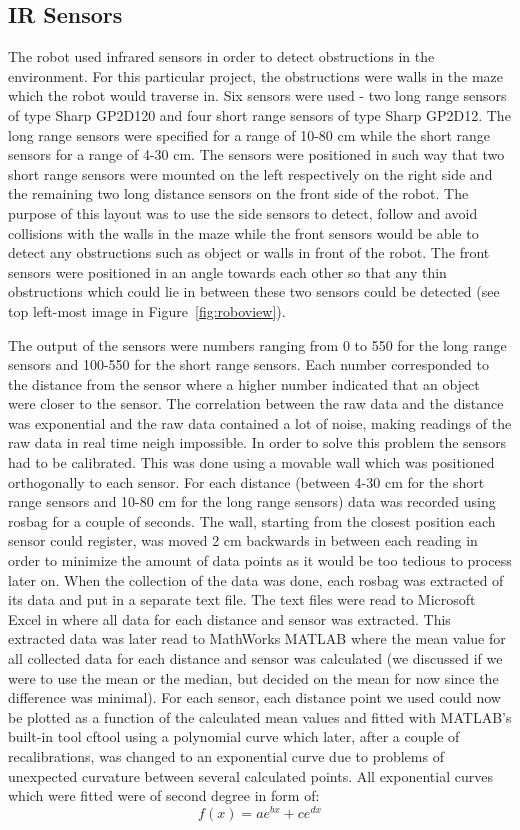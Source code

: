 \documentclass[10pt,a4paper,twocolumn]{article}
\begin{document}
\subsection{IR Sensors}
The robot used infrared sensors in order to detect obstructions in the
environment. For this particular project, the obstructions were walls in the
maze which the robot would traverse in. Six sensors were used - two long range
sensors of type Sharp GP2D120 and four short range sensors of type Sharp GP2D12.
The long range sensors were specified for a range of 10-80 cm while the short
range sensors for a range of 4-30 cm. The sensors were positioned in such way
that two short range sensors were mounted on the left respectively on the right
side and the remaining two long distance sensors on the front side of the robot.
The purpose of this layout was to use the side sensors to detect, follow and
avoid collisions with the walls in the maze while the front sensors would be
able to detect any obstructions such as object or walls in front of the robot.
The front sensors were positioned in an angle towards each other so that any
thin obstructions which could lie in between these two sensors could be detected
(see top left-most image in Figure~\ref{fig:roboview}).

The output of the sensors were numbers ranging from 0 to 550 for the long range
sensors and 100-550 for the short range sensors. Each number corresponded to the
distance from the sensor where a higher number indicated that an object were
closer to the sensor. The correlation between the raw data and the distance was
exponential and the raw data contained a lot of noise, making readings of the
raw data in real time neigh impossible.  In order to solve this problem the
sensors had to be calibrated. This was done using a movable wall which was
positioned orthogonally to each sensor. For each distance (between 4-30 cm for
the short range sensors and 10-80 cm for the long range sensors) data was
recorded using rosbag for a couple of seconds. The wall, starting from the
closest position each sensor could register, was moved 2 cm backwards in between
each reading in order to minimize the amount of data points as it would be too
tedious to process later on.  When the collection of the data was done, each
rosbag was extracted of its data and put in a separate text file. The text files
were read to Microsoft Excel in where all data for each distance and sensor was
extracted. This extracted data was later read to MathWorks MATLAB where the mean
value for all collected data for each distance and sensor was calculated (we
discussed if we were to use the mean or the median, but decided on the mean for
now since the difference was minimal). For each sensor, each distance point we
used could now be plotted as a function of the calculated mean values and fitted
with MATLAB’s built-in tool cftool using a polynomial curve which later, after a
couple of recalibrations, was changed to an exponential curve due to problems of
unexpected curvature between several calculated points. All exponential curves
which were fitted were of second degree in form of: 
\begin{equation}
  \label{eqn:eq1}
  f(x) = ae^{bx}+ce^{dx}    
\end{equation}
\end{document}
